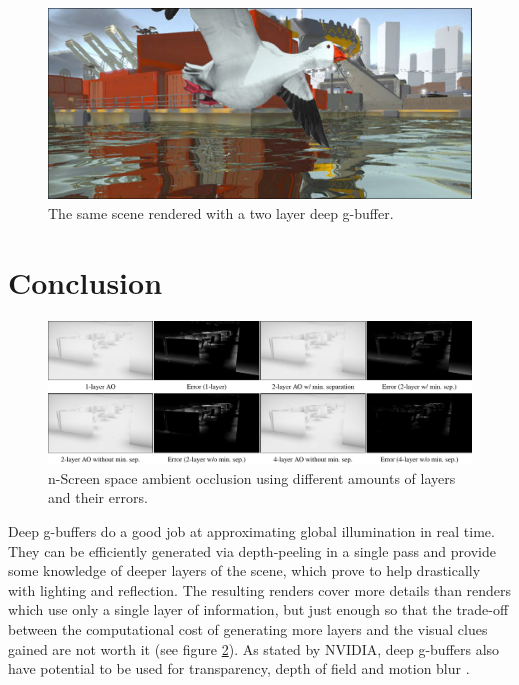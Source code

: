 \documentclass{ACGSeminar}
\begin{document}
		\begin{figure}[htb!] %
			\begin{center}%
				\includegraphics[width=.5\textwidth]{img/duck_two.png} %
			\end{center}%
			\caption{The same scene rendered with a two layer deep g-buffer.}%
			\label{fig:duck_two}%
		\end{figure} %
\newpage
\section{Conclusion}
	\begin{figure}[htb!] %
		\begin{center}%
			\includegraphics[width=\textwidth]{img/multi_layer_ao.png} %
		\end{center}%
		\caption{n-Screen space ambient occlusion using different amounts of layers and their errors.}%
		\label{fig:multi_layer_ao}%
	\end{figure} %
	Deep g-buffers do a good job at approximating global illumination in real time. They can be efficiently generated via depth-peeling in a single pass and provide some knowledge of deeper layers of the scene, which prove to help drastically with lighting and reflection. The resulting renders cover more details than renders which use only a single layer of information, but just enough so that the trade-off between the computational cost of generating more layers and the visual clues gained are not worth it (see figure \ref{fig:multi_layer_ao}). As stated by NVIDIA, deep g-buffers also have potential to be used for transparency, depth of field and motion blur \cite{Mara2016DeepGBuffer}.
\end{document}
